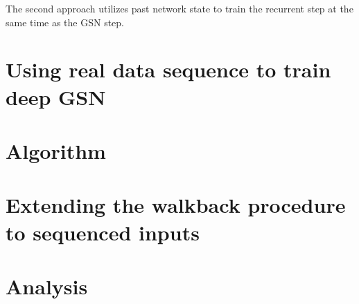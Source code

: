 The second approach utilizes past network state to train the recurrent step at the same time as the GSN step.

\section{Using real data sequence to train deep GSN}

\section{Algorithm}

\section{Extending the walkback procedure to sequenced inputs}

\section{Analysis}